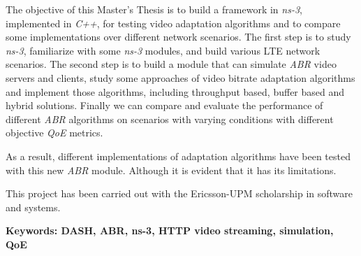 The objective of this Master's Thesis is to build a framework in \textit{ns-3}, implemented
in \textit{C++}, for testing video adaptation algorithms and to compare some implementations
over different network scenarios. The first step is to study \textit{ns-3}, familiarize with
some \textit{ns-3} modules, and build various LTE network scenarios. The second step is to
build a module that can simulate \textit{ABR} video servers and clients, study some approaches
of video bitrate adaptation algorithms and implement those algorithms, including
throughput based, buffer based and hybrid solutions. Finally we can compare and 
evaluate the performance of different \textit{ABR} algorithms on scenarios with varying 
conditions with different objective \textit{QoE} metrics.

As a result, different implementations of adaptation algorithms have been tested with
this new \textit{ABR} module. Although it is evident that it has its limitations.

This project has been carried out with the Ericsson-UPM scholarship in software and systems.

\vfill
\textbf{Keywords: DASH, ABR, ns-3, HTTP video streaming, simulation, QoE} 